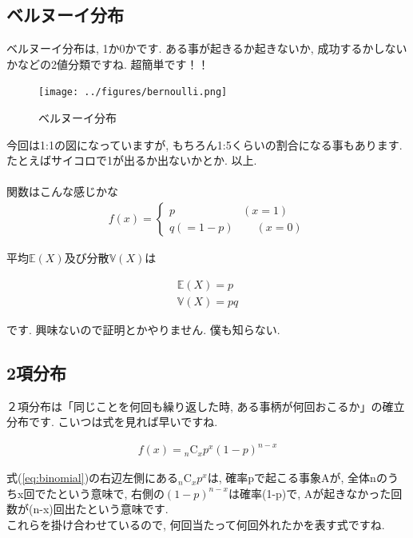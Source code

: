 \documentclass[11pt,a4paper,uplatex]{ujreport} 	%
\begin{document}
\subsection{ベルヌーイ分布}
ベルヌーイ分布は, 1か0かです. ある事が起きるか起きないか, 成功するかしないかなどの2値分類ですね. 超簡単です！！\\

\begin{figure}[H]
\label{im:bernoulli}
  \centering
  \texttt{[image: ../figures/bernoulli.png]}
  \caption{ベルヌーイ分布}
\end{figure}

今回は1:1の図になっていますが, もちろん1:5くらいの割合になる事もあります. たとえばサイコロで1が出るか出ないかとか. 以上.\\
\\

関数はこんな感じかな
\begin{align}
f(x)=
  \left\{
    \begin{array}{l}
      p \qquad \qquad \qquad (x = 1) \\
      q(=1-p)  \qquad (x=0)
    \end{array}
  \right.
\end{align}

平均$\mathbb{E}(X)$及び分散$\mathbb{V}(X)$は

\begin{align}
\mathbb{E}(X) = p\\
\mathbb{V}(X) = pq
\end{align}

です. 興味ないので証明とかやりません. 僕も知らない.
\subsection{2項分布}
２項分布は「同じことを何回も繰り返した時, ある事柄が何回おこるか」の確立分布です. こいつは式を見れば早いですね.

\begin{align}
\label{eq:binomial}
f(x) = {}_n\mathrm{C}_x p^x(1-p)^{n-x}
\end{align}

式(\ref{eq:binomial})の右辺左側にある${}_n\mathrm{C}_x p^x$は, 確率pで起こる事象Aが, 全体nのうちx回でたという意味で, 右側の$(1-p)^{n-x}$は確率(1-p)で, Aが起きなかった回数が(n-x)回出たという意味です.\\

これらを掛け合わせているので, 何回当たって何回外れたかを表す式ですね.
\end{document}
